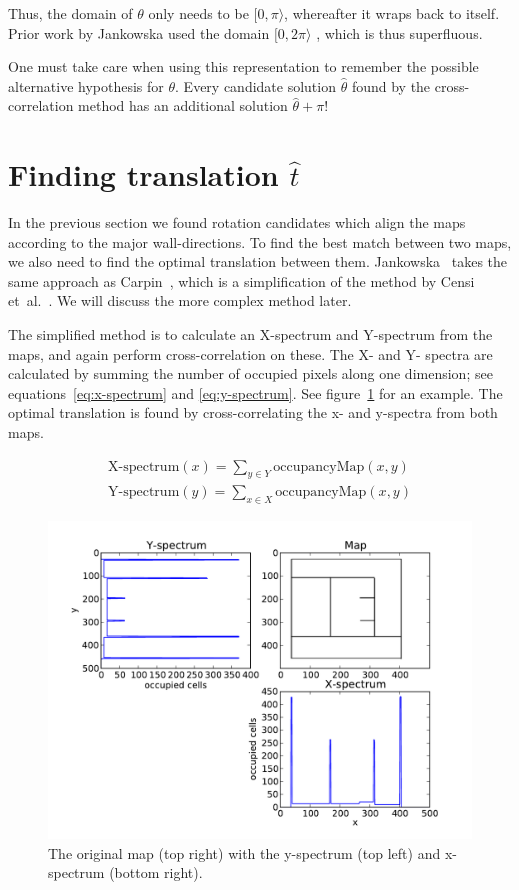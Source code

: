 Thus, the domain of $\theta$ only needs to be $[0, \pi \rangle$, whereafter it wraps back to itself. Prior work by Jankowska used the domain $[0, 2\pi\rangle$ \cite{jankowska2009hough}, which is thus superfluous.

One must take care when using this representation to remember the possible alternative hypothesis for $\theta$. Every candidate solution $\hat\theta$ found by the cross-correlation method has an additional solution $\hat\theta + \pi$!

\section{Finding translation $\hat t$}
In the previous section we found rotation candidates which align the maps according to the major wall-directions. To find the best match between two maps, we also need to find the optimal translation between them. Jankowska~\cite{jankowska2009hough} takes the same approach as Carpin~\cite{carpin2008merging}, which is a simplification of the method by Censi et~al.~\cite{censi2005scan}. We will discuss the more complex method later. 

The simplified method is to calculate an X-spectrum and Y-spectrum from the maps, and again perform cross-correlation on these. The X- and Y- spectra are calculated by summing the number of occupied pixels along one dimension; see equations~\ref{eq:x-spectrum} and \ref{eq:y-spectrum}. See figure~\ref{fig:x-y-spectra} for an example. The optimal translation is found by cross-correlating the x- and y-spectra from both maps.

\begin{eqnarray}
\label{eq:x-spectrum}
\textrm{X-spectrum}(x) = \sum_{y \in Y} \textrm{occupancyMap}(x, y) \\
\label{eq:y-spectrum}
\textrm{Y-spectrum}(y) = \sum_{x \in X} \textrm{occupancyMap}(x, y) 
\end{eqnarray}

\begin{figure}[ht]
	\centering
	\includegraphics[width=\textwidth]{images/stitching/x_y_spectra.pdf}
	
	\caption{The original map (top right) with the y-spectrum (top left) and x-spectrum (bottom right).}
	\label{fig:x-y-spectra}
\end{figure}

